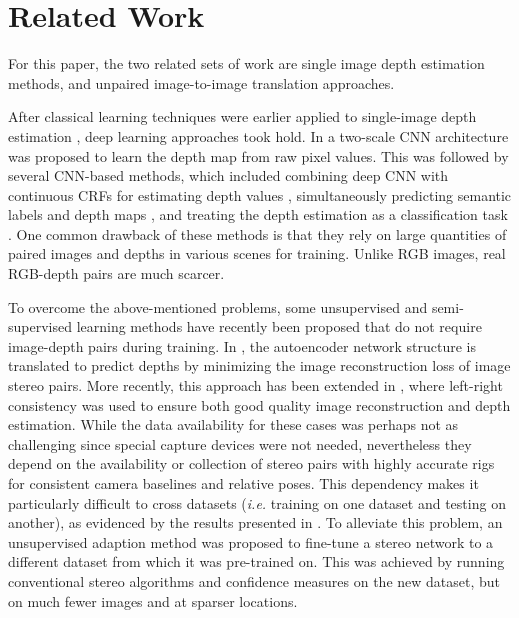 \documentclass[runningheads]{llncs}
\def\ie{\emph{i.e.}\xspace}
\begin{document}
\section{Related Work}

For this paper, the two related sets of work are single image depth estimation methods, and unpaired image-to-image translation approaches. 

After classical learning techniques were earlier applied to single-image depth estimation \cite{Hoiem2005,Saxena2008,saxena2009make3d,karsch2012depth,ladicky2014pulling}, deep learning approaches took hold. In \cite{eigen2014depth} a two-scale CNN architecture was proposed to learn the depth map from raw pixel values. This was followed by several CNN-based methods, which included combining deep CNN with continuous CRFs for estimating depth values \cite{liu2016learning}, simultaneously predicting semantic labels and depth maps \cite{wang2015towards}, and treating the depth estimation as a classification task \cite{cao2017estimating}. One common drawback of these methods is that they rely on large quantities of paired images and depths in various scenes for training. Unlike RGB images, real RGB-depth pairs are much scarcer. 

To overcome the above-mentioned problems, some unsupervised and semi-supervised learning methods have recently been proposed that do not require image-depth pairs during training.
In \cite{garg2016unsupervised}, the autoencoder network structure is translated to predict depths by minimizing the image reconstruction loss of image stereo pairs. More recently, this approach has been extended in \cite{godard2017unsupervised,kuznietsov2017semi}, where left-right consistency was used to ensure both good quality image reconstruction and depth estimation. While the data availability for these cases was perhaps not as challenging since special capture devices were not needed, nevertheless they depend on the availability or collection of stereo pairs with highly accurate rigs for consistent camera baselines and relative poses. This dependency makes it particularly difficult to cross datasets (\ie training on one dataset and testing on another), as evidenced by the results presented in \cite{godard2017unsupervised}. To alleviate this problem, an unsupervised adaption method \cite{tonioni2017unsupervised} was proposed to fine-tune a stereo network to a different dataset from which it was pre-trained on. This was achieved by running conventional stereo algorithms and confidence measures on the new dataset, but on much fewer images and at sparser locations.
\end{document}
